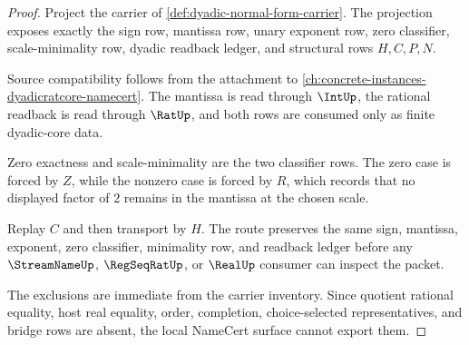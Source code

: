 \begin{proof}
Project the carrier of \autoref{def:dyadic-normal-form-carrier}. The projection exposes exactly the sign row, mantissa row, unary exponent row, zero classifier, scale-minimality row, dyadic readback ledger, and structural rows $H,C,P,N$.

Source compatibility follows from the attachment to \autoref{ch:concrete-instances-dyadicratcore-namecert}. The mantissa is read through $\IntUp$, the rational readback is read through $\RatUp$, and both rows are consumed only as finite dyadic-core data.

Zero exactness and scale-minimality are the two classifier rows. The zero case is forced by $Z$, while the nonzero case is forced by $R$, which records that no displayed factor of $2$ remains in the mantissa at the chosen scale.

Replay $C$ and then transport by $H$. The route preserves the same sign, mantissa, exponent, zero classifier, minimality row, and readback ledger before any $\StreamNameUp$, $\RegSeqRatUp$, or $\RealUp$ consumer can inspect the packet.

The exclusions are immediate from the carrier inventory. Since quotient rational equality, host real equality, order, completion, choice-selected representatives, and bridge rows are absent, the local NameCert surface cannot export them.
\end{proof}

